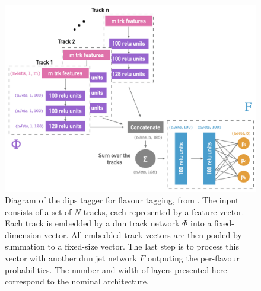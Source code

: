 \begin{figure}[h!]
  \center
  \includegraphics[scale=0.6]{Images/FTAG/dips_structure.png}
  \caption{Diagram of the \gls{dips} tagger for flavour tagging, from \cite{ATL-PHYS-PUB-2020-014}. The input consists of a set of $N$ tracks, each represented by a feature vector. Each track is embedded by a \gls{dnn} track network $\Phi$ into a fixed-dimension vector. All embedded track vectors are then pooled by summation to a fixed-size vector. The last step is to process this vector with another \gls{dnn} jet network $F$ outputing the per-flavour probabilities. The number and width of layers presented here correspond to the nominal architecture.} 
  \label{fig:dipsModel}
\end{figure}

